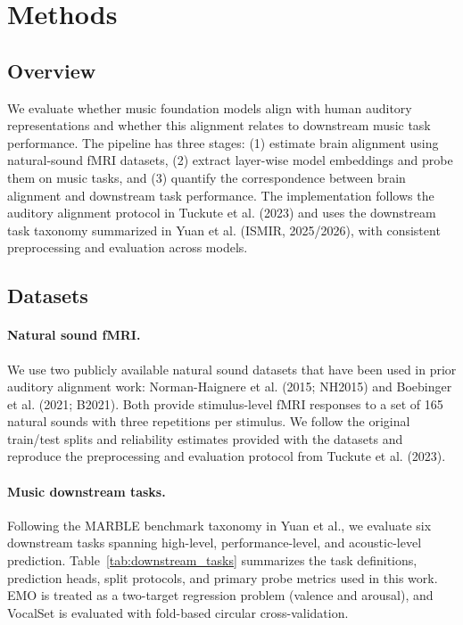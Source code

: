 \section{Methods}
\label{sec:methods}

\subsection{Overview}
We evaluate whether music foundation models align with human auditory representations and whether this alignment relates to downstream music task performance. The pipeline has three stages: (1) estimate brain alignment using natural-sound fMRI datasets, (2) extract layer-wise model embeddings and probe them on music tasks, and (3) quantify the correspondence between brain alignment and downstream task performance. The implementation follows the auditory alignment protocol in Tuckute et al. (2023) and uses the downstream task taxonomy summarized in Yuan et al. (ISMIR, 2025/2026), with consistent preprocessing and evaluation across models.

\subsection{Datasets}
\paragraph{Natural sound fMRI.}
We use two publicly available natural sound datasets that have been used in prior auditory alignment work: Norman-Haignere et al. (2015; NH2015) and Boebinger et al. (2021; B2021). Both provide stimulus-level fMRI responses to a set of 165 natural sounds with three repetitions per stimulus. We follow the original train/test splits and reliability estimates provided with the datasets and reproduce the preprocessing and evaluation protocol from Tuckute et al. (2023).

\paragraph{Music downstream tasks.}
Following the MARBLE benchmark taxonomy in Yuan et al., we evaluate six downstream tasks spanning high-level, performance-level, and acoustic-level prediction. Table~\ref{tab:downstream_tasks} summarizes the task definitions, prediction heads, split protocols, and primary probe metrics used in this work. EMO is treated as a two-target regression problem (valence and arousal), and VocalSet is evaluated with fold-based circular cross-validation.

